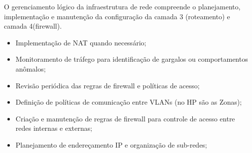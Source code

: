O gerenciamento lógico da infraestrutura de rede compreende o planejamento, implementação e manutenção da configuração da camada 3 (roteamento) e camada 4(firewall).

\begin{itemize} 
    \item Implementação de NAT quando necessário; 
    \item Monitoramento de tráfego para identificação de gargalos ou comportamentos anômalos; 
    \item Revisão periódica das regras de firewall e políticas de acesso; 
    \item Definição de políticas de comunicação entre VLANs (no HP são as Zonas); 
    \item Criação e manutenção de regras de firewall para controle de acesso entre redes internas e externas; 
    \item Planejamento de endereçamento IP e organização de sub-redes; 
\end{itemize}


